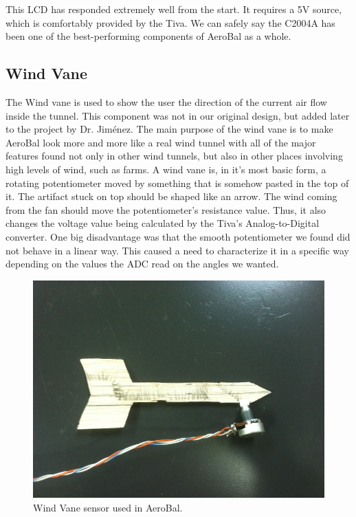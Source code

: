 		This LCD has responded extremely well from the start. It requires a 5V source, which is comfortably provided by the Tiva. We can safely say the C2004A has been one of the best-performing components of AeroBal as a whole.
		
		\subsection{Wind Vane}
		
		The Wind vane is used to show the user the direction of the current air flow inside the tunnel. This component was not in our original design, but added later to the project by Dr. Jim\'{e}nez. The main purpose of the wind vane is to make AeroBal look more and more like a real wind tunnel with all of the major features found not only in other wind tunnels, but also in other places involving high levels of wind, such as farms.
		A wind vane is, in it's most basic form, a rotating potentiometer moved by something that is somehow pasted in the top of it. The artifact stuck on top should be shaped like an arrow. The wind coming from the fan should move the potentiometer's resistance value. Thus, it also changes the voltage value being calculated by the Tiva's Analog-to-Digital converter.
		One big disadvantage was that the smooth potentiometer we found did not behave in a linear way. This caused a need to characterize it in a specific way depending on the values the ADC read on the angles we wanted. 
		\begin{figure}[H]
			\centering
				\includegraphics[scale=0.1]{img/windVane}
			\caption{Wind Vane sensor used in AeroBal.}
		\end{figure}
		
